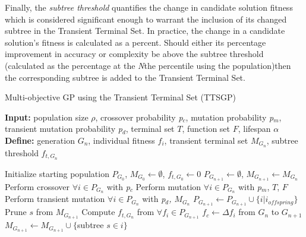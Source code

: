 \documentclass[a4paper, twocolumn]{article}
\begin{document}
Finally, the \textit{subtree threshold} quantifies the change in candidate solution fitness which is considered significant enough to warrant the inclusion of its changed subtree in the Transient Terminal Set. In practice, the change in a candidate solution's fitness is calculated as a percent. Should either its percentage improvement in accuracy or complexity be above the subtree threshold (calculated as the percentage at the \textit{N}the percentile using the population)then the corresponding subtree is added to the Transient Terminal Set.
\begin{algorithm*}[h]
	\caption{Multi-objective GP using the Transient Terminal Set (TTSGP)}
	\hspace*{\algorithmicindent} \textbf{Input:} population size \(\rho\), crossover probability \textit{p$_{c}$}, mutation probability \textit{p$_{m}$}, transient mutation probability \textit{p$_{d}$}, terminal set \(T\), function set \(F\), lifespan \(\alpha\) \\
	\hspace*{\algorithmicindent} \textbf{Define:} generation \(G_{n}\), individual fitness \(f_{i}\), transient terminal set \(M_{G_{n}}\), subtree threshold \(f_{t, G_{n}}\) \\ 
	\begin{algorithmic}[1]
		\State Initialize starting population \textit{$ P_{G_{0}} $}, \(M_{G_{0}}\leftarrow \emptyset\), \(f_{t, G_{0}} \leftarrow 0\)
		 
		\State \(P_{G_{n+1}}\leftarrow \emptyset\), \(M_{G_{n+1}}\leftarrow M_{G_{n}}\)
			
		\State Perform crossover $\forall i\in P_{G_{n}}$ with \textit{p$_{c}$}
		\State Perform mutation $\forall i\in P_{G_{n}}$ with \textit{p$_{m}$}, \(T\), \(F\)
		\State Perform transient mutation $\forall i\in P_{G_{n}}$ with \textit{p$_{d}$, \(M_{G_{n}}\)}
		\State $P_{G_{n+1}} \leftarrow P_{G_{n+1}}\cup \{i | i_{offspring}\}$
		\EndWhile\newline
			
		\State Prune \(s\) from \(M_{G_{n+1}}\)
		\EndIf
		\EndFor
		\State Compute $f_{t, G_{n}}$ from $\forall f_{i} \in P_{G_{n+1}}$
		\State $f_{c}\leftarrow \Delta f_{i}$ from \(G_{n}\) to \(G_{n+1}\)
		\State \(M_{G_{n+1}} \leftarrow M_{G_{n+1}} \cup \{\)subtree \(s\in i \}\)
		\EndIf
		\EndFor 
		\EndWhile
	\end{algorithmic}
\end{algorithm*}
\end{document}
